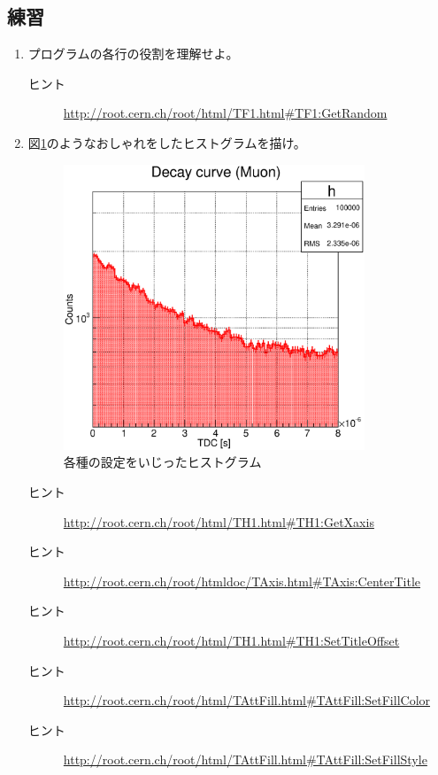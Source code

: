 \documentclass{jarticle}
\begin{document}
  \subsection{練習}
  \begin{enumerate}
   \item プログラムの各行の役割を理解せよ。
	 \begin{description}
	  \item[ヒント] \url{http://root.cern.ch/root/html/TF1.html#TF1:GetRandom}
	 \end{description}

   \item 図\ref{Fig:ranfunsol1canvas1}のようなおしゃれをしたヒストグラムを描け。
	 \begin{figure}[htbp]
	  \begin{center}
	   \includegraphics[width = 90mm]{./picture/ranfunsol1canvas1.eps}
	  \end{center}
	  \caption{各種の設定をいじったヒストグラム}
	  \label{Fig:ranfunsol1canvas1}
	 \end{figure}
	 \begin{description}
	  \item[ヒント] \url{http://root.cern.ch/root/html/TH1.html#TH1:GetXaxis}
	  \item[ヒント] \url{http://root.cern.ch/root/htmldoc/TAxis.html#TAxis:CenterTitle}
	  \item[ヒント] \url{http://root.cern.ch/root/html/TH1.html#TH1:SetTitleOffset}
	  \item[ヒント] \url{http://root.cern.ch/root/html/TAttFill.html#TAttFill:SetFillColor}
	  \item[ヒント] \url{http://root.cern.ch/root/html/TAttFill.html#TAttFill:SetFillStyle}
	 \end{description}


\end{enumerate}
\end{document}

